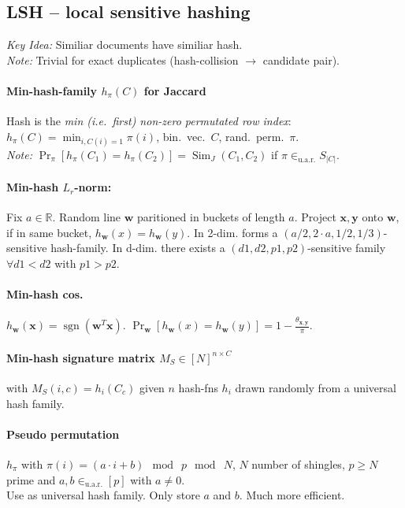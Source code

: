 \documentclass[10pt]{scrartcl}
\DeclareMathOperator{\sign}{sgn}
\DeclareMathOperator{\Sim}{Sim}
\newcommand{\R}{\mathbb{R}}
\newcommand{\inuar}{\in_{\text{u.a.r.}}}
\begin{document}
\begin{multicols}{3}
\subsection{LSH -- local sensitive hashing}
\emph{Key Idea:} Similiar documents have similiar hash. \\
\emph{Note:} Trivial for exact duplicates (hash-collision $\rightarrow$ candidate pair).
\paragraph{Min-hash-family $h_\pi(C)$ for Jaccard}
Hash is the \emph{min (i.e.\ first) non-zero permutated row index}: $h_\pi(C) = \min_{i, C(i) = 1} \pi(i)$,
bin.\ vec.\ $C$, rand.\ perm.\ $\pi$. \\
\emph{Note:} $\Pr_\pi[h_\pi(C_1) = h_\pi(C_2)] = \Sim_J(C_1,C_2)$ if $\pi \inuar S_{|C|}$.
\paragraph{Min-hash $L_r$-norm:}
Fix $a \in \R$.
Random line $\bm w$ paritioned in buckets of length $a$.
Project $\bm x, \bm y$ onto $\bm w$, if in same bucket, $h_{\bm w}(x) = h_{\bm w}(y)$.
In 2-dim. forms a $(a/2, 2\cdot a, 1/2, 1/3)$-sensitive hash-family.
In d-dim. there exists a $(d1, d2, p1, p2)$-sensitive family $\forall d1 < d2$ with $p1 > p2$.
\paragraph{Min-hash cos.} $h_{\bm w}(\bm x) = \sign(\bm w^T\bm x)$. $\Pr_{\bm w}[h_{\bm w}(x) = h_{\bm w}(y)] = 1 - \frac{\theta_{\bm x, \bm y}}{\pi}$.
\paragraph{Min-hash signature matrix $M_S \in [N]^{n\times C}$}
with $M_S(i,c) = h_i(C_c)$
given $n$ hash-fns $h_i$ drawn randomly from a universal hash family.

\paragraph{Pseudo permutation}
$h_\pi$ with $\pi(i) = (a\cdot i + b) \mod\ p \mod\ N$, $N$ number of shingles, $p\geq N$ prime and $a,b \inuar [p]$ with $a \neq 0$. \\
Use as universal hash family. Only store $a$ and $b$. Much more efficient.


\end{multicols}
\end{document}
